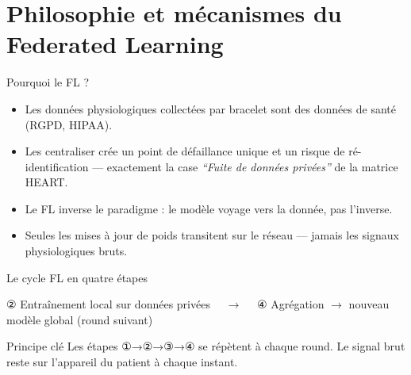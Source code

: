 \documentclass[aspectratio=169,11pt]{beamer}
\begin{document}
\section{Philosophie et mécanismes du Federated Learning}

\begin{frame}{Pourquoi le FL ?}
  \begin{itemize}
    \item Les données physiologiques collectées par bracelet sont des
      données de santé (RGPD, HIPAA).
    \item Les centraliser crée un point de défaillance unique et un risque
      de ré-identification --- exactement la case \emph{``Fuite de données
      privées''} de la matrice HEART.
    \item Le FL inverse le paradigme : le modèle voyage vers la donnée, pas
      l'inverse.
    \item Seules les mises à jour de poids transitent sur le réseau ---
      jamais les signaux physiologiques bruts.
  \end{itemize}
\end{frame}

\begin{frame}{Le cycle FL en quatre étapes}
  \centering
  \vspace{0.5em}
  \small
  ② Entraînement local sur données privées $\quad\to\quad$
  ④ Agrégation $\to$ nouveau modèle global (round suivant)
  \vspace{0.3em}

  \begin{block}{Principe clé}
    \small Les étapes ①→②→③→④ se répètent à chaque round. Le signal brut
    reste sur l'appareil du patient à chaque instant.
  \end{block}
\end{frame}
\end{document}
